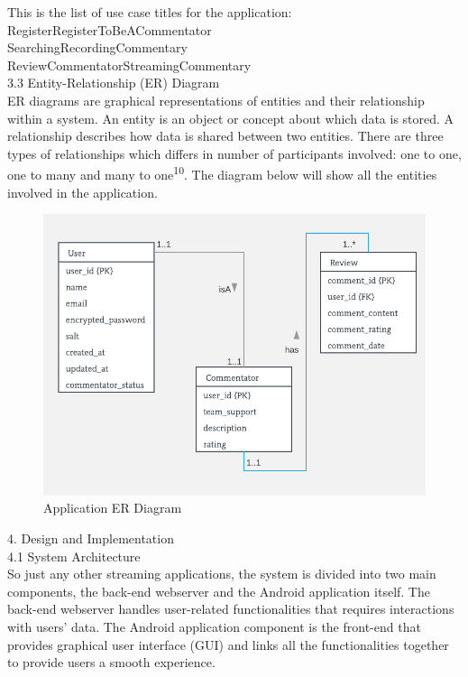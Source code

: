 \documentclass{article}
\begin{document}
\begin{flushleft}
This is the list of use case titles for the application:\\
\noindent Register\hfill RegisterToBeACommentator\\
\noindent Searching\hfill RecordingCommentary\\
\noindent ReviewCommentator\hfill StreamingCommentary\\
{\Large 3.3 Entity-Relationship (ER) Diagram}\\
ER diagrams are graphical representations of entities and their relationship within a system. An entity is an object or concept about which data is stored. A relationship describes how data is shared between two entities.  There are three types of relationships which differs in number of participants involved: one to one, one to many and many to one\textsuperscript{10}. The diagram below will show all the entities involved in the application.\\
\begin{figure}[h]
	\centering
	\includegraphics[width=14cm]{er-diagram}
	\caption{Application ER Diagram}
	\label{fig:er-diagram}
\end{figure}
{\huge 4. Design and Implementation}\\
{\Large 4.1 System Architecture}\\
So just any other streaming applications, the system is divided into two main components, the back-end webserver and the Android application itself. The back-end webserver handles user-related functionalities that requires interactions with users' data. The Android application component is the front-end that provides graphical user interface (GUI) and links all the functionalities together to provide users a smooth experience.\\

\end{flushleft}
\end{document}
